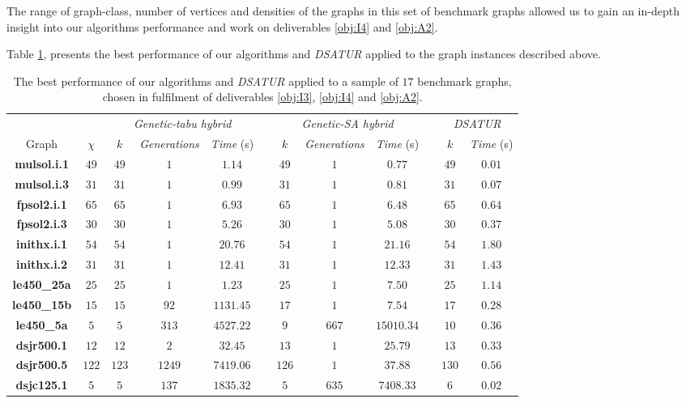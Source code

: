 \documentclass[12pt,a4paper]{article}
\begin{document}
The range of graph-class, number of vertices and densities of the graphs in this set of benchmark graphs allowed us to gain an in-depth insight into our algorithms performance and work on deliverables \ref{obj:I4} and \ref{obj:A2}.
\par Table \ref{tab:results}, presents the best performance of our algorithms and \textit{DSATUR} applied to the graph instances described above.
\vfill
\begin{table}[!htb]
\caption{The best performance of our algorithms  and \textit{DSATUR} applied to a sample of $17$ benchmark graphs, chosen in fulfilment of deliverables \ref{obj:I3}, \ref{obj:I4} and \ref{obj:A2}.}
\label{tab:results}
\centering
\begin{tabular}{cc|cccccccccc}
\hline
& & \multicolumn{3}{c}{\textit{Genetic-tabu hybrid}} & & \multicolumn{3}{c}{\textit{Genetic-SA hybrid}} & & \multicolumn{2}{c}{\textit{DSATUR}}\\
\cline{3-5} \cline{7-9} \cline{11-12}
Graph    & $\chi$ & $k$ & \textit{Generations} & \textit{Time} (s) & & $k$ & \textit{Generations} & \textit{Time} (s) & & $k$ & \textit{Time} (s)\\
\hline
\textbf{mulsol.i.1} & $49$ & $49$ & $1$ & $1.14$ &  & $49$ & $1$ & $0.77$ &  & $49$ & $0.01$\\
\textbf{mulsol.i.3}  & $31$ & $31$ & $1$ & $0.99$ &  & $31$ & $1$ & $0.81$ &  & $31$ & $0.07$\\
\textbf{fpsol2.i.1}  & $65$ & $65$ & $1$ & $6.93$ &  & $65$ & $1$ & $6.48$ &  & $65$ & $0.64$\\
\textbf{fpsol2.i.3}  & $30$ & $30$ & $1$ & $5.26$ &  & $30$ & $1$ & $5.08$ &  & $30$ & $0.37$\\
\textbf{inithx.i.1}  & $54$ & $54$ & $1$ & $20.76$ &  & $54$ & $1$ & $21.16$ &  & $54$ & $1.80$\\
\textbf{inithx.i.2}  & $31$ & $31$ & $1$ & $12.41$ &  & $31$ & $1$ & $12.33$ &  & $31$ & $1.43$\\
\hline
\textbf{le450\_25a} & $25$ & $25$ & $1$ & $1.23$ &  & $25$ & $1$  & $7.50$ &  & $25$ & $1.14$\\
\textbf{le450\_15b} & $15$ & $15$ & $92$ & $1131.45$ &  & $17$ & $1$  & $7.54$ &  & $17$ & $0.28$\\

\textbf{le450\_5a} & $5$ & $5$ & $313$ & $4527.22$ &  & $9$ & $667$ & $15010.34$ & & $10$ & $0.36$\\

\hline
\textbf{dsjr500.1} & $12$ & $12$ & $2$ & $32.45$  &  & $13$ & $1$ & $25.79$ & & $13$ & $0.33$\\
\textbf{dsjr500.5} & $122$ & $123$ & $1249$ & $7419.06$  &  & $126$ & $1$ & $37.88$ & & $130$ & $0.56$\\
\hline
\textbf{dsjc125.1} & $5$ & $5$ & $137$ & $1835.32$  &  & $5$ & $635$ & $7408.33$ & & $6$ & $0.02$\\


\end{tabular}
\end{table}
\end{document}
